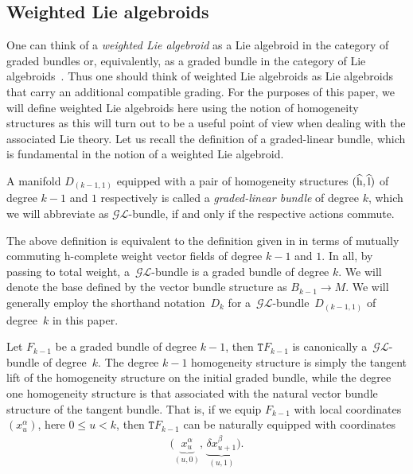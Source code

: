 \documentclass[10pt,a4paper]{amsart}
\newcommand{\rmh}{\textnormal{h}}
\newcommand{\rml}{\textnormal{l}}
\def\sT{{\mathtt T}}
\numberwithin{equation}{section}
\begin{document}
\subsection{Weighted Lie algebroids}
 One can think of  a \emph{weighted Lie algebroid} as a Lie algebroid in the category of graded bundles or, equivalently, as a graded bundle in the category of Lie algebroids~\cite{Bruce:2014}. Thus one should think of weighted Lie algebroids as Lie algebroids that carry an additional compatible grading. For the purposes of this paper, we will def\/ine weighted Lie algebroids here using the notion of homogeneity structures as this will turn out to be a useful point of view when dealing with the associated Lie theory.  Let us recall the def\/inition of a graded-linear bundle, which is fundamental in the notion of a weighted Lie algebroid.

\begin{Definition}
A manifold $D_{(k-1, 1)}$ equipped with a pair of homogeneity structures $(\widehat{\rmh}, \widehat{\rml})$ of degree $k-1$ and $1$ respectively is called a \emph{graded-linear bundle} of degree $k$, which we will abbreviate as $\mathcal{GL}$-bundle, if and only if the respective actions commute.
\end{Definition}



The above def\/inition is equivalent to the def\/inition given in \cite{Bruce:2014} in terms of mutually commuting h-complete weight vector f\/ields of degree $k-1$ and $1$. In all, by passing to total weight, a~$\mathcal{GL}$-bundle is a graded bundle of degree $k$. We will denote the base def\/ined by the vector bundle structure as $B_{k-1} \rightarrow M$. We will  generally employ the shorthand notation~$D_{k}$ for a~$\mathcal{GL}$-bundle~$D_{(k-1,1)}$ of degree~$k$ in this paper.


\begin{Example}
Let $F_{k-1}$ be a graded bundle of degree $k-1$, then $\sT F_{k-1}$ is canonically a~$\mathcal{GL}$-bundle of degree~$k$. The degree $k-1$ homogeneity structure is simply the tangent lift of the homogeneity structure on the initial graded bundle, while the degree one homogeneity structure is that associated with the natural vector bundle structure of the tangent bundle. That is, if we equip $F_{k-1}$ with local coordinates $(x^{\alpha}_{u})$, here $0 \leq u < k$, then  $\sT F_{k-1}$ can be naturally equipped with coordinates
\begin{gather*}
\big(\underbrace{x^{\alpha}_{u}}_{(u,0)}, \, \underbrace{\delta x_{u+1}^{\beta}}_{(u,1)}\big).
\end{gather*}
\end{Example}
\end{document}
